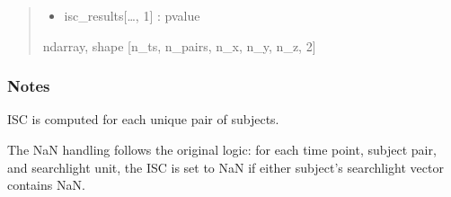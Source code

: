 \documentclass[letterpaper,10pt,english]{sphinxhowto}
\begin{document}
\begin{fulllineitems}
\begin{quote}
\begin{description}
\begin{itemize}
\item {} 
\sphinxAtStartPar
isc\_results{[}…, 1{]} : p\sphinxhyphen{}value

\end{itemize}


\sphinxAtStartPar
ndarray, shape {[}n\_ts, n\_pairs, n\_x, n\_y, n\_z, 2{]}

\end{description}\end{quote}
\subsubsection*{Notes}

\sphinxAtStartPar
ISC is computed for each unique pair of subjects.

\sphinxAtStartPar
The NaN handling follows the original logic: for each time point, subject
pair, and searchlight unit, the ISC is set to NaN if either subject’s
searchlight vector contains NaN.

\end{fulllineitems}

\end{document}
